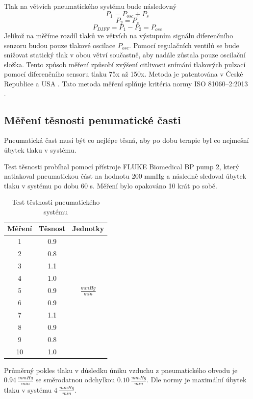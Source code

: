 Tlak na větvích pneumatického systému bude následovný
\begin{equation*}
    P_1 = P_{osc} + P_s
\end{equation*}
\begin{equation*}
    P_2 = P_s
\end{equation*}
\begin{equation}
    P_{DIFF} = P_1 - P_2 = P_{osc}
\end{equation}
Jelikož na měříme rozdíl tlaků ve větvích na výstupním signálu diferenčního senzoru budou pouze tlakové oscilace $P_{osc}$.
Pomocí regulačních ventilů se bude snižovat statický tlak v obou větví součastně, aby nadále zůstala pouze oscilační složka.
Tento způsob měření způsobí zvýšení citlivosti snímání tlakových pulzací pomocí diferenčního sensoru tlaku 75x až 150x. \cite{cite:Habilitace}
Metoda je patentována v České Republice a USA \cite{cite:2}. Tato metoda měření splňuje kritéria normy ISO 81060–2:2013 \cite{cite:Validation}.
\subsection{Měření těsnosti penumatické časti}
Pneumatická čast musí být co nejlépe těsná, aby po dobu terapie byl co nejmešní úbytek tlaku v systému.
\par
Test těsnosti probíhal pomocí přístroje FLUKE Biomedical BP pump 2, který natlakoval pneumatickou část na hodnotu 200 mmHg a následně sledoval úbytek tlaku v systému po dobu 60 s.
Měření bylo opakováno 10 krát po sobě.

\begin{table}[H]
    \label{tab:pressure_test_pneu}
    \caption{Test těstnosti pneumatického systému}
    \begin{ctucolortab}
        \begin{tabular}{ccc}
            \toprule
            Měření & Těsnost & Jednotky           \\ \midrule
            1      & 0.9     &                    \\
            2      & 0.8     &                    \\
            3      & 1.1     &                    \\
            4      & 1.0     &                    \\
            5      & 0.9     & $\frac{mmHg}{min}$ \\
            6      & 0.9     &                    \\
            7      & 1.1     &                    \\
            8      & 0.9     &                    \\
            9      & 0.8     &                    \\
            10     & 1.0     &                    \\
            \bottomrule
        \end{tabular}
    \end{ctucolortab}
\end{table}
Průměrný pokles tlaku v důsledku úniku vzduchu z pneumatického obvodu je $0.94 \ \frac{mmHg}{min}$ se směrodatnou odchylkou $0.10  \ \frac{mmHg}{min}$. Dle normy je maximální úbytek tlaku v systému $4 \ \frac{mmHg}{min}$.
